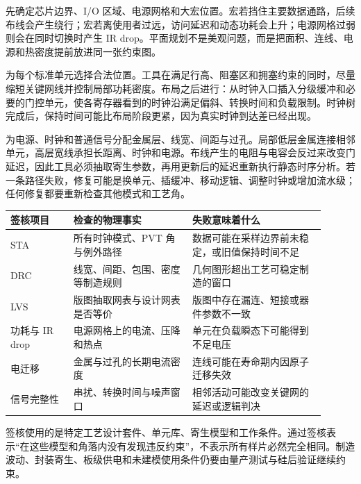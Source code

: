 先确定芯片边界、I/O 区域、电源网格和大宏位置。宏若挡住主要数据通路，后续布线会产生绕行；宏若离使用者过远，访问延迟和动态功耗会上升；电源网格过弱则会在同时切换时产生 IR drop。平面规划不是美观问题，而是把面积、连线、电源和热密度提前放进同一张约束图。


为每个标准单元选择合法位置。工具在满足行高、阻塞区和拥塞约束的同时，尽量缩短关键网线并控制局部功耗密度。布局之后进行：从时钟入口插入分级缓冲和必要的门控单元，使各寄存器看到的时钟沿满足偏斜、转换时间和负载限制。时钟树完成后，保持时间可能比布局阶段更紧，因为真实时钟到达差已经出现。

为电源、时钟和普通信号分配金属层、线宽、间距与过孔。局部低层金属连接相邻单元，高层宽线承担长距离、时钟和电源。布线产生的电阻与电容会反过来改变门延迟，因此工具必须抽取寄生参数，再用更新后的延迟重新执行静态时序分析。若一条路径失败，修复可能是换单元、插缓冲、移动逻辑、调整时钟或增加流水级；任何修复都要重新检查其他模式和工艺角。


\begin{longtable}{L{0.18\linewidth}L{0.34\linewidth}L{0.38\linewidth}}
\toprule
签核项目 & 检查的物理事实 & 失败意味着什么 \\
\midrule
STA & 所有时钟模式、PVT 角与例外路径 & 数据可能在采样边界前未稳定，或旧值保持时间不足 \\\tablerowrule
DRC & 线宽、间距、包围、密度等制造规则 & 几何图形超出工艺可稳定制造的窗口 \\\tablerowrule
LVS & 版图抽取网表与设计网表是否等价 & 版图中存在漏连、短接或器件参数不一致 \\\tablerowrule
功耗与 IR drop & 电源网格上的电流、压降和热点 & 单元在负载瞬态下可能得到不足电压 \\\tablerowrule
电迁移 & 金属与过孔的长期电流密度 & 连线可能在寿命期内因原子迁移失效 \\\tablerowrule
信号完整性 & 串扰、转换时间与噪声窗口 & 相邻活动可能改变关键网的延迟或逻辑判决 \\
\bottomrule
\end{longtable}

签核使用的是特定工艺设计套件、单元库、寄生模型和工作条件。通过签核表示“在这些模型和角落内没有发现违反约束”，不表示所有样片必然完全相同。制造波动、封装寄生、板级供电和未建模使用条件仍要由量产测试与硅后验证继续约束。

